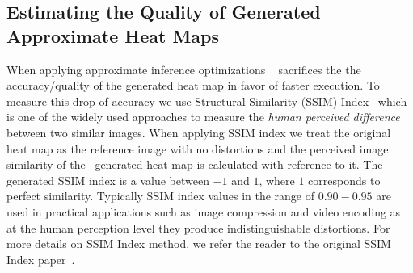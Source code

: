 \subsection{Estimating the Quality of Generated Approximate Heat Maps}

When applying approximate inference optimizations \system~ sacrifices the the accuracy/quality of the generated heat map in favor of faster execution.
To measure this drop of accuracy we use Structural Similarity (SSIM) Index~\cite{wang2004image} which is one of the widely used approaches to measure the \textit{human perceived difference} between two similar images.
When applying SSIM index we treat the original heat map as the reference image with no distortions and the perceived image similarity of the \system~generated heat map is calculated with reference to it.
The generated SSIM index is a value between $-1$ and $1$, where $1$ corresponds to perfect similarity.
Typically SSIM index values in the range of $0.90-0.95$ are used in practical applications such as image compression and video encoding as at the human perception level they produce indistinguishable distortions.
For more details on SSIM Index method, we refer the reader to the original SSIM Index paper~\cite{wang2004image}.


